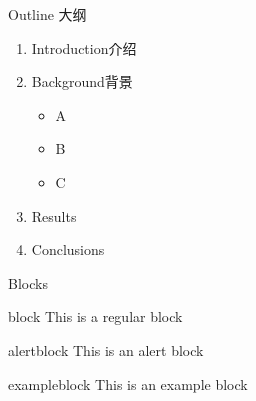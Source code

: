 
\begin{frame}[t]{Outline
大纲
}
\vspace{3ex}
 {
	\begin{enumerate}[leftmargin=1.1cm,rightmargin=0.2cm,itemsep=3ex,font=\normalfont\color{tueblue},label={\arabic*}]
		\item Introduction介绍
		\item  Background背景
		\begin{itemize}
		    \item 	A
		    \item   B
		    \item 	C
		\end{itemize}
		\item {Results }
		\item  {Conclusions}
	\end{enumerate}
}
\end{frame}















\begin{frame}[t]{Blocks}
\vspace{2ex}
\begin{block}{block}
	This is a regular block
\end{block}
\begin{alertblock}{alertblock}
	This is an alert block
\end{alertblock}
\begin{exampleblock}{exampleblock}
	This is an example block
\end{exampleblock}
\end{frame}



